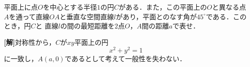 \documentclass[a4j]{jarticle}
\begin{document}

\begin{oframed}
平面上に点$O$を中心とする半径$1$の円$C$がある．また，この平面上の$O$と異なる点$A$を通って直線$OA$と垂直な空間直線$l$があり，平面とのなす角が$45^\circ$である．このとき，円$C$と
直線$l$の間の最短距離を$2$点$O$，$A$間の距離$a$で表せ．
\end{oframed}

\setlength{\columnseprule}{0.4pt}
\begin{multicols}{2}
{\bf[解]}対称性から，$C$が$xy$平面上の円
     \[x^2+y^2=1\]
に一致し，$A(a,0)$であるとして考えて一般性を失わない．
     
\newpage
\end{multicols}
\end{document}
